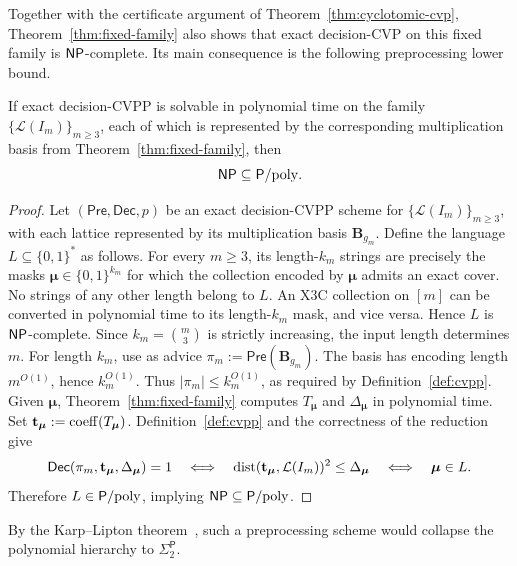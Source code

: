 Together with the certificate argument of
Theorem~\ref{thm:cyclotomic-cvp}, Theorem~\ref{thm:fixed-family} also shows
that exact decision-CVP on this fixed family is $\mathsf{NP}$-complete.  Its main consequence
is the following preprocessing lower bound.

\begin{corollary}
\label{cor:cvpp}
If exact decision-CVPP is solvable in polynomial time on the
family $\{\mathcal L(I_m)\}_{m\geq3}$, each of which is represented by the
corresponding multiplication basis from Theorem~\ref{thm:fixed-family}, then
\[
 \mathsf{NP}\subseteq\mathsf{P}/\mathrm{poly}.
\]
\end{corollary}

\begin{proof}
Let \((\mathsf{Pre},\mathsf{Dec},p)\) be an exact
decision-CVPP scheme for \(\{\mathcal L(I_m)\}_{m\geq3}\), with each lattice
represented by its multiplication basis \(\mathbf B_{g_m}\).
Define the language
\(L\subseteq\{0,1\}^*\) as follows.  For every \(m\geq3\), its
length-\(k_m\) strings are precisely the masks
\(\boldsymbol\mu\in\{0,1\}^{k_m}\) for which the collection encoded by
\(\boldsymbol\mu\) admits an exact cover.  No strings of any other length
belong to \(L\).
An X3C collection on \([m]\) can be converted in polynomial
time to its length-\(k_m\) mask, and vice versa.  Hence \(L\) is
\(\mathsf{NP}\)-complete.  Since $k_m=\binom m3$ is strictly
increasing, the input length determines $m$.
For length $k_m$, use as advice
\(\pi_m:=\mathsf{Pre}(\mathbf B_{g_m})\).  The basis has
encoding length \(m^{O(1)}\), hence \(k_m^{O(1)}\).
Thus \(|\pi_m|\leq k_m^{O(1)}\), as required by
Definition~\ref{def:cvpp}.
Given $\boldsymbol\mu$, Theorem~\ref{thm:fixed-family}
computes $T_{\boldsymbol\mu}$ and $\Delta_{\boldsymbol\mu}$ in polynomial
time.  Set $\mathbf t_{\boldsymbol\mu}:=\operatorname{coeff}(T_{\boldsymbol\mu})$.
Definition~\ref{def:cvpp} and the correctness of the reduction give
\[
\mathsf{Dec}(\pi_m,\mathbf t_{\boldsymbol\mu},\Delta_{\boldsymbol\mu})=1
\quad\Longleftrightarrow\quad
\operatorname{dist}(\mathbf t_{\boldsymbol\mu},\mathcal L(I_m))^2\leq
\Delta_{\boldsymbol\mu}
\quad\Longleftrightarrow\quad
\boldsymbol\mu\in L.
\]
Therefore
$L\in\mathsf{P}/\mathrm{poly}$, implying $\mathsf{NP}\subseteq\mathsf{P}/\mathrm{poly}$.
\end{proof}

By the Karp--Lipton theorem~\cite{KarpLipton1980}, such a preprocessing
scheme would collapse the polynomial hierarchy to $\Sigma_2^{\mathsf P}$.

